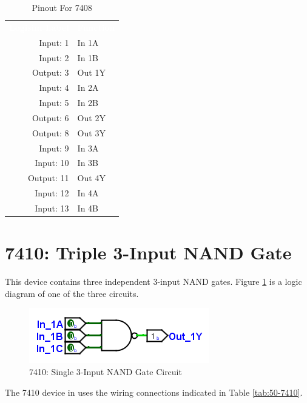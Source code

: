\begin{table}[H]
	\sffamily
	\newcommand{\head}[1]{\textcolor{white}{\textbf{#1}}}		
	\begin{center}
		\begin{tabular}{rl} 
			\rowcolor{black!75}
			\head{Logisim Label} & \head{Function} \\
			Input: 1   & In 1A  \\
			Input: 2   & In 1B  \\
			Output: 3  & Out 1Y \\
			Input: 4   & In 2A  \\
			Input: 5   & In 2B  \\
			Output: 6  & Out 2Y \\
			Output: 8  & Out 3Y \\
			Input: 9   & In 3A  \\
			Input: 10  & In 3B  \\
			Output: 11 & Out 4Y \\
			Input: 12  & In 4A  \\
			Input: 13  & In 4B  \\
		\end{tabular}
	\end{center}
	\caption{Pinout For 7408}
	\label{tab:50-7408}
\end{table}

\section{7410: Triple 3-Input NAND Gate}

This device contains three independent 3-input NAND gates. Figure \ref{fig:50-7410} is a logic diagram of one of the three circuits.

\begin{figure}[H]
	\centering
	\includegraphics{gfx/50-7410}
	\caption{7410: Single 3-Input NAND Gate Circuit}
	\label{fig:50-7410}
\end{figure}

The 7410 device in \LE uses the wiring connections indicated in Table \ref{tab:50-7410}.

